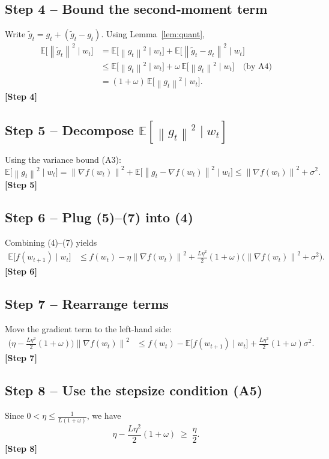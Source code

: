 \documentclass{article}
\newcommand{\E}{\mathbb{E}}
\newcommand{\norm}[1]{\left\lVert #1\right\rVert}
\newcommand{\grad}{\nabla}
\begin{document}
\subsection*{Step 4 – Bound the second‑moment term}
Write $\tilde g_t = g_t + (\tilde g_t-g_t)$. Using Lemma~\ref{lem:quant},
\begin{align}
\E\!\big[\norm{\tilde g_t}^2\mid w_t\big]
&= \E\!\big[\norm{g_t}^2\mid w_t\big]
   +\E\!\big[\norm{\tilde g_t-g_t}^2\mid w_t\big] \nonumber\\
&\le \E\!\big[\norm{g_t}^2\mid w_t\big]
   +\omega\,\E\!\big[\norm{g_t}^2\mid w_t\big]  \quad\text{(by A4)}\nonumber\\
&= (1+\omega)\,\E\!\big[\norm{g_t}^2\mid w_t\big] .
\tag{6}
\end{align}
\textbf{[Step 4]}

\subsection*{Step 5 – Decompose $\E[\norm{g_t}^2\mid w_t]$}
Using the variance bound (A3):
\[
\E\!\big[\norm{g_t}^2\mid w_t\big]
= \norm{\grad f(w_t)}^2 + \E\!\big[\norm{g_t-\grad f(w_t)}^2\mid w_t\big]
\le \norm{\grad f(w_t)}^2 + \sigma^2 .
\tag{7}
\]
\textbf{[Step 5]}

\subsection*{Step 6 – Plug (5)–(7) into (4)}
Combining (4)–(7) yields
\begin{align}
\E\!\big[f(w_{t+1})\mid w_t\big]
&\le f(w_t)-\eta\norm{\grad f(w_t)}^2
   +\frac{L\eta^2}{2}(1+\omega)\big(\norm{\grad f(w_t)}^2+\sigma^2\big) .
\tag{8}
\end{align}
\textbf{[Step 6]}

\subsection*{Step 7 – Rearrange terms}
Move the gradient term to the left‑hand side:
\begin{align}
\Big(\eta-\frac{L\eta^2}{2}(1+\omega)\Big)\norm{\grad f(w_t)}^2
&\le f(w_t)-\E\!\big[f(w_{t+1})\mid w_t\big]
   +\frac{L\eta^2}{2}(1+\omega)\sigma^2 .
\tag{9}
\end{align}
\textbf{[Step 7]}

\subsection*{Step 8 – Use the stepsize condition (A5)}
Since $0<\eta\le\frac{1}{L(1+\omega)}$, we have
\[
\eta-\frac{L\eta^2}{2}(1+\omega)
\;\ge\;\frac{\eta}{2}.
\tag{10}
\]
\textbf{[Step 8]}
\end{document}
